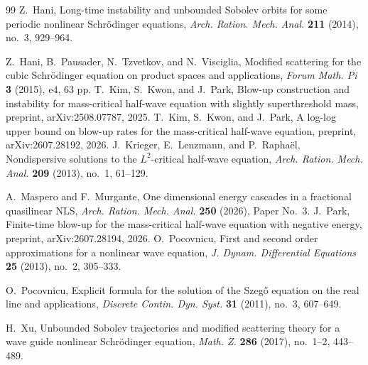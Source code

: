 \documentclass[11pt,reqno]{amsart}
\numberwithin{equation}{section}
\theoremstyle{remark}
\begin{document}
\begin{thebibliography}{99}
Z.~Hani,
\newblock Long-time instability and unbounded Sobolev orbits for some periodic
nonlinear Schr\"odinger equations,
\newblock \emph{Arch. Ration. Mech. Anal.} \textbf{211} (2014), no.~3,
929--964.

Z.~Hani, B.~Pausader, N.~Tzvetkov, and N.~Visciglia,
\newblock Modified scattering for the cubic Schr\"odinger equation on product
spaces and applications,
\newblock \emph{Forum Math. Pi} \textbf{3} (2015), e4, 63 pp.
T.~Kim, S.~Kwon, and J.~Park,
\newblock Blow-up construction and instability for mass-critical half-wave
equation with slightly superthreshold mass,
\newblock preprint, arXiv:2508.07787, 2025.
T.~Kim, S.~Kwon, and J.~Park,
\newblock A log-log upper bound on blow-up rates for the mass-critical
half-wave equation,
\newblock preprint, arXiv:2607.28192, 2026.
J.~Krieger, E.~Lenzmann, and P.~Rapha\"el,
\newblock Nondispersive solutions to the $L^2$-critical half-wave equation,
\newblock \emph{Arch. Ration. Mech. Anal.} \textbf{209} (2013), no.~1, 61--129.

A.~Maspero and F.~Murgante,
\newblock One dimensional energy cascades in a fractional quasilinear NLS,
\newblock \emph{Arch. Ration. Mech. Anal.} \textbf{250} (2026), Paper No.~3.
J.~Park,
\newblock Finite-time blow-up for the mass-critical half-wave equation
with negative energy,
\newblock preprint, arXiv:2607.28194, 2026.
O.~Pocovnicu,
\newblock First and second order approximations for a nonlinear wave equation,
\newblock \emph{J. Dynam. Differential Equations} \textbf{25} (2013), no.~2,
305--333.

O.~Pocovnicu,
\newblock Explicit formula for the solution of the Szeg\H{o} equation on the
real line and applications,
\newblock \emph{Discrete Contin. Dyn. Syst.} \textbf{31} (2011), no.~3,
607--649.

H.~Xu,
\newblock Unbounded Sobolev trajectories and modified scattering theory for a
wave guide nonlinear Schr\"odinger equation,
\newblock \emph{Math. Z.} \textbf{286} (2017), no.~1--2, 443--489.

\end{thebibliography}
\end{document}
